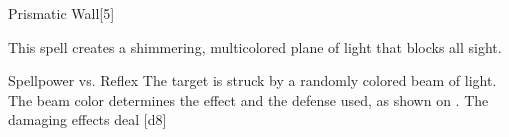 \begin{spellsection}{Prismatic Wall}[5]
    \begin{spellheader}
    \end{spellheader}
    \begin{spellcontent}
        \begin{spelltargetinginfo}
        \end{spelltargetinginfo}
        \begin{spelleffects}
            \spelleffect This spell creates a shimmering, multicolored plane of light that blocks all sight.
            \spelldur \durshort \dismissable
        \end{spelleffects}
    \end{spellcontent}
    \begin{spellsubcontent}
        \begin{spelltargetinginfo}
        \end{spelltargetinginfo}
        \begin{spelleffects}
            \begin{spellattack}{Spellpower vs. Reflex}
                \spellspecial The target is struck by a randomly colored beam of light. The beam color determines the effect and the defense used, as shown on . The damaging effects deal \spelldamage{}[d8]
            \end{spellattack}
        \end{spelleffects}
    \end{spellsubcontent}
    \begin{spellfooter}
        \miscastexplode
    \end{spellfooter}
\end{spellsection}

